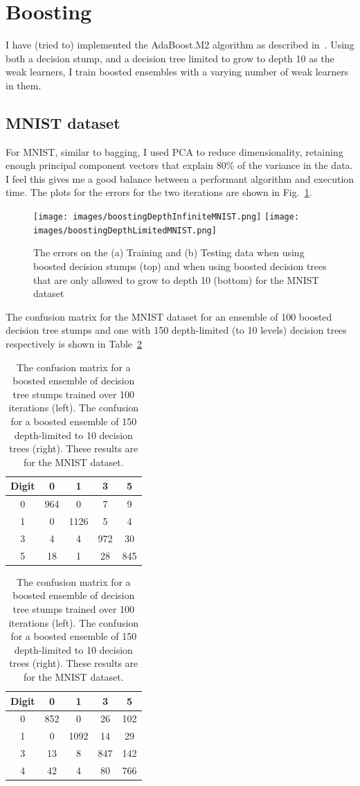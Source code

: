 \documentclass[5pt]{article}
\begin{document}
\section{Boosting}
I have (tried to) implemented the AdaBoost.M2 algorithm as described
in~\cite{freund1996experiments}. Using both a decision stump, and a decision
tree limited to grow to depth 10 as the weak learners, I train boosted
ensembles
with a varying number of weak learners in them.

\subsection{MNIST dataset}
For MNIST, similar to bagging, I used PCA to reduce dimensionality, retaining
enough principal component vectors that explain 80\% of the variance in the
data. I feel this gives me a good balance between a performant algorithm and
execution time.  The plots for the errors for the two iterations are shown in
Fig.~\ref{fig:errorsMNISTBoosting}.

\begin{figure}
  \texttt{[image: images/boostingDepthInfiniteMNIST.png]}
  \texttt{[image: images/boostingDepthLimitedMNIST.png]}
\label{fig:errorsMNISTBoosting}
\caption{The errors on the (a) Training and (b) Testing data when
  using boosted decision stumps (top) and when using boosted decision trees
that are only allowed to grow to depth 10 (bottom) for the MNIST dataset}
\end{figure}

The confusion matrix for the MNIST dataset for an ensemble of 100 boosted
decision tree stumps and one with 150 depth-limited (to 10 levels)
decision trees respectively is shown in Table~\ref{tab:confusionMNISTBoost}
\begin{table}
\centering
\begin{tabular}{ccccc}
\toprule
Digit & 0 & 1 & 3 & 5 \\
\midrule
0 & 964 & 0 & 7 & 9\\
1 & 0 & 1126 & 5 & 4\\
3 & 4 & 4 & 972 & 30\\
5 & 18 & 1 & 28 & 845\\
\bottomrule
\end{tabular}
\quad
\begin{tabular}{ccccc}
\toprule
Digit & 0 & 1 & 3 & 5\\
\midrule
0 & 852 & 0 & 26 & 102\\
1 & 0  & 1092 &  14 & 29\\
3 & 13 & 8 & 847 & 142\\
4 & 42 & 4 & 80 & 766\\
\bottomrule
\end{tabular}
\caption{The confusion matrix for a boosted ensemble of decision tree stumps
  trained over 100 iterations (left). The confusion for a boosted ensemble of
  150 depth-limited to 10 decision trees (right). These results are for the MNIST
dataset.}
\label{tab:confusionMNISTBoost}
\end{table}
\end{document}

